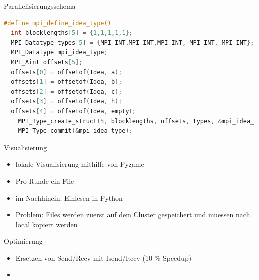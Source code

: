 \begin{frame}[fragile]{Parallelisierungsschema}
\begin{lstlisting}[language=C,basicstyle=\small,breaklines=true,keywordstyle=\color{black}]
#define mpi_define_idea_type()                                               
  int blocklengths[5] = {1,1,1,1,1};                                  
  MPI_Datatype types[5] = {MPI_INT,MPI_INT,MPI_INT, MPI_INT, MPI_INT};       
  MPI_Datatype mpi_idea_type;                                                
  MPI_Aint offsets[5];                                                   
  offsets[0] = offsetof(Idea, a);                                            
  offsets[1] = offsetof(Idea, b);                                            
  offsets[2] = offsetof(Idea, c);                                            
  offsets[3] = offsetof(Idea, h);                                            
  offsets[4] = offsetof(Idea, empty);                                        
    MPI_Type_create_struct(5, blocklengths, offsets, types, &mpi_idea_type); 
    MPI_Type_commit(&mpi_idea_type);                                         
\end{lstlisting}
\end{frame}

\begin{frame}{Visualisierung}
	\begin{itemize}
		\item lokale Visualisierung mithilfe von Pygame
		\item Pro Runde ein File
		\item im Nachhinein: Einlesen in Python
		\item Problem: Files werden zuerst auf dem Cluster gespeichert und muessen nach local kopiert werden
	\end{itemize}
\end{frame}

\begin{frame}{Optimierung}
	\begin{itemize}
		\item Ersetzen von Send/Recv mit Isend/Recv (10 \% Speedup)
		\item 
	\end{itemize}
\end{frame}
